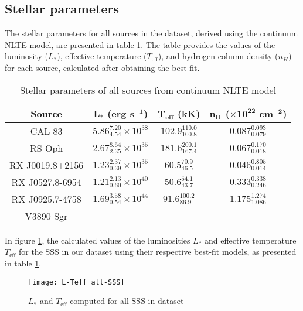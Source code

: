 		\subsection{Stellar parameters}
			The stellar parameters for all sources in the dataset, derived using the continuum NLTE model, are presented in table \ref{tab:sss-stellar-params}. The table provides the values of the luminosity ($L_*$), effective temperature ($T_\text{eff}$), and hydrogen column density ($n_H$) for each source, calculated after obtaining the best-fit.
			\renewcommand{\arraystretch}{1.8}
			\begin{table}[!htb]
				\centering
				\caption{Stellar parameters of all sources from continuum NLTE model}
				\label{tab:sss-stellar-params}
				\begin{tabular}{cccc}
				\hline
				{\textbf{Source}} & {$\boldsymbol{L_*}$ \textbf{(erg s$\boldsymbol{^{-1}}$)}} & {\textbf{$\boldsymbol{T_\text{eff}}$ (kK)}} & {\textbf{$\boldsymbol{n_H}$ ($\boldsymbol{\times 10^{22}}$ cm$\boldsymbol{^{-2}}$)}} \\
				\hline
				{CAL 83} & {$5.86_{4.54}^{7.20}\times 10^{38}$} & {$102.9_{100.8}^{110.0}$} & {$0.087_{0.079}^{0.093}$} \\
				{RS Oph} & {$2.67_{2.35}^{8.64}\times 10^{35}$} & {$181.6_{167.4}^{200.1}$} & {$0.067_{0.018}^{0.170}$} \\
				{RX J0019.8+2156} & {$1.23_{0.39}^{2.37}\times 10^{35}$} & {$60.5_{46.5}^{70.9}$} & {$0.046_{0.014}^{0.805}$} \\
				{RX J0527.8-6954} & {$1.21_{0.60}^{2.13}\times 10^{40}$} & {$50.6_{43.7}^{54.1}$} & {$0.333_{0.246}^{0.338}$} \\
				{RX J0925.7-4758} & {$1.69_{0.54}^{3.58}\times 10^{44}$} & {$91.6_{86.9}^{100.2}$} & {$1.175_{1.086}^{1.274}$} \\
				{V3890 Sgr} & {} & {} & {} \\
				\hline
				\end{tabular}
			\end{table}
			\renewcommand{\arraystretch}{2.2}
			
			In figure \ref{result:L-Teff-SSS}, the calculated values of the luminosities $L_*$ and effective temperature $T_\text{eff}$ for the SSS in our dataset using their respective best-fit models, as presented in table \ref{tab:sss-stellar-params}.
			\begin{figure}[h!]
				\centering
				\texttt{[image: L-Teff\_all-SSS]}
				\caption{$L_*$ and $T_\text{eff}$ computed for all SSS in dataset}
				\label{result:L-Teff-SSS}
			\end{figure}
		

